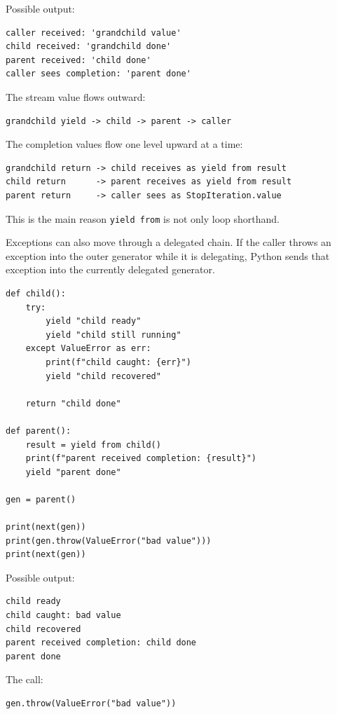 Possible output:

\begin{verbatim}
caller received: 'grandchild value'
child received: 'grandchild done'
parent received: 'child done'
caller sees completion: 'parent done'
\end{verbatim}

The stream value flows outward:

\begin{verbatim}
grandchild yield -> child -> parent -> caller
\end{verbatim}

The completion values flow one level upward at a time:

\begin{verbatim}
grandchild return -> child receives as yield from result
child return      -> parent receives as yield from result
parent return     -> caller sees as StopIteration.value
\end{verbatim}

This is the main reason \texttt{yield from} is not only loop shorthand.

Exceptions can also move through a delegated chain. If the caller throws an exception into the outer generator while it is delegating, Python sends that exception into the currently delegated generator.

\begin{verbatim}
def child():
    try:
        yield "child ready"
        yield "child still running"
    except ValueError as err:
        print(f"child caught: {err}")
        yield "child recovered"

    return "child done"

def parent():
    result = yield from child()
    print(f"parent received completion: {result}")
    yield "parent done"

gen = parent()

print(next(gen))
print(gen.throw(ValueError("bad value")))
print(next(gen))
\end{verbatim}

Possible output:

\begin{verbatim}
child ready
child caught: bad value
child recovered
parent received completion: child done
parent done
\end{verbatim}

The call:

\begin{verbatim}
gen.throw(ValueError("bad value"))
\end{verbatim}

